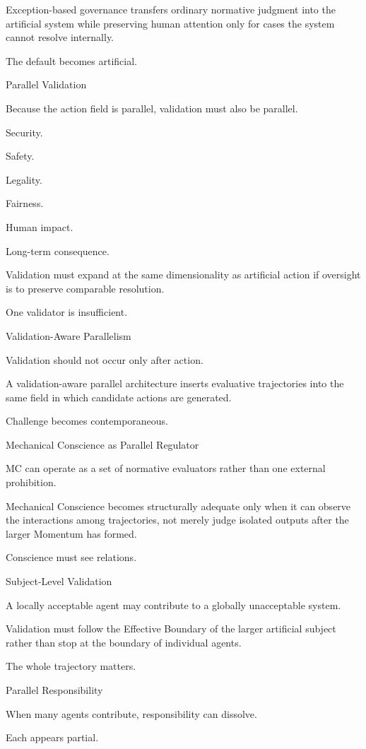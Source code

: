 Exception-based governance transfers ordinary normative judgment into the artificial system while preserving human attention only for cases the system cannot resolve internally.

The default becomes artificial.

Parallel Validation

Because the action field is parallel, validation must also be parallel.

Security.

Safety.

Legality.

Fairness.

Human impact.

Long-term consequence.

Validation must expand at the same dimensionality as artificial action if oversight is to preserve comparable resolution.

One validator is insufficient.

Validation-Aware Parallelism

Validation should not occur only after action.

A validation-aware parallel architecture inserts evaluative trajectories into the same field in which candidate actions are generated.

Challenge becomes contemporaneous.

Mechanical Conscience as Parallel Regulator

MC can operate as a set of normative evaluators rather than one external prohibition.

Mechanical Conscience becomes structurally adequate only when it can observe the interactions among trajectories, not merely judge isolated outputs after the larger Momentum has formed.

Conscience must see relations.

Subject-Level Validation

A locally acceptable agent may contribute to a globally unacceptable system.

Validation must follow the Effective Boundary of the larger artificial subject rather than stop at the boundary of individual agents.

The whole trajectory matters.

Parallel Responsibility

When many agents contribute, responsibility can dissolve.

Each appears partial.

